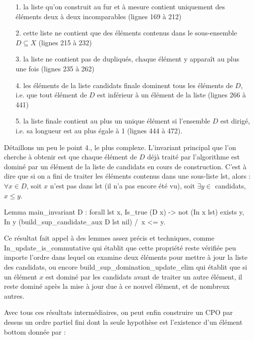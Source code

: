 \documentclass{article}
\newcommand\code[1]{{\fontfamily{lmtt}\selectfont #1}}
\theoremstyle{definition}
\begin{document}
\begin{itemize}
\item[1.] la liste qu'on construit au fur et à mesure contient uniquement des éléments deux à deux incomparables (lignes 169 à 212)
\item[2.] cette liste ne contient que des éléments contenus dans le sous-ensemble $D \subseteq X$ (lignes 215 à 232)
\item[3.] la liste ne contient pas de dupliqués, chaque élément y apparaît au plus une fois (lignes 235 à 262)
\item[4.] les éléments de la liste \code{candidats} finale dominent tous les éléments de $D$, i.e. que tout élément de $D$ est inférieur à un élément de la liste (lignes 266 à 441)
\item[5.] la liste finale contient au plus un unique élément si l'ensemble $D$ est dirigé, i.e. sa longueur est au plus égale à 1 (lignes 444 à 472).
\end{itemize}


Détaillons un peu le point 4., le plus complexe. L'invariant principal que l'on cherche à obtenir est que chaque élément de $D$ déjà traité par l'algorithme est dominé par un élément de la liste de candidats en cours de construction. C'est à dire que si on a fini de traiter les éléments contenus dans une sous-liste \code{lst}, alors : $\forall x \in D$, soit $x$ n'est pas dans \code{lst} (il n'a pas encore été vu), soit $\exists y \in$ \code{candidats}, $x \leq y$.


\begin{coq}
Lemma main_invariant D : forall lst x, Is_true (D x) -> not (In x lst) 
    \/ exists y, In y (build_sup_candidate_aux D lst nil) /\ x <= y.
\end{coq}

Ce résultat fait appel à des lemmes assez précis et techniques, comme \code{In\_update\_is\_commutative} qui établit que cette propriété reste vérifiée peu importe l'ordre dans lequel on examine deux éléments pour mettre à jour la liste des \code{candidats}, ou encore \code{build\_sup\_domination\_update\_elim} qui établit que si un élément $x$ est dominé par les \code{candidats} avant de traiter un autre élément, il reste dominé après la mise à jour due à ce nouvel élément, et de nombreux autres.

Avec tous ces résultats intermédiaires, on peut enfin construire un CPO par dessus un ordre partiel fini dont la seule hypothèse est l'existence d'un élément bottom donnée par :
\end{document}
